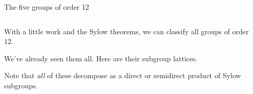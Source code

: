 \documentclass[8pt, handout]{beamer}
\begin{document}

\begin{frame}{The five groups of order 12} %

  \vspace{5mm}

  \begin{columns}
    \begin{column}{.5\textwidth}
      With a little work and the Sylow theorems, we can classify all
      groups of order $12$. \bigskip

      We've already seen them all. Here are their subgroup lattices. \bigskip

      Note that \emph{all} of these decompose as a direct or
      semidirect product of Sylow subgroups.
    \end{column}
    \begin{column}{.45\textwidth}
    \end{column}
  \end{columns}
  
  \vspace{-40mm}


\end{frame}
\end{document}
